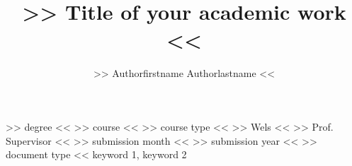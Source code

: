 	\title
		{>> Title of your academic work <<}
	\author
		{>> Authorfirstname Authorlastname <<}


	\degree		
		{>> degree <<}	
	\course		
		{>> course <<}
	\coursestype
		{>> course type <<}
	\location	
		{>> Wels <<}
	\supervisor	
		{>> Prof. Supervisor <<}
	\submonth	
		{>> submission month <<}
	\subyear	
		{>> submission year <<}
	\doctype	
		{>> document type <<}
	\keywords
		{keyword 1, keyword 2}